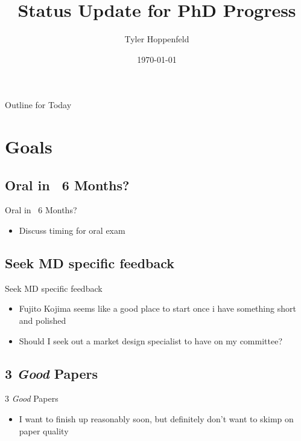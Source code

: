 \documentclass{beamer}
\title[Phd Status]{Status Update for PhD Progress}
\author{Tyler Hoppenfeld}
\institute{UC Davis}
\date{\today}
\begin{document}
\begin{frame}
  \titlepage
\end{frame}

\begin{frame}{Outline for Today}
  \tableofcontents
\end{frame}

\section{Goals}

\subsection{Oral in ~6 Months?}

\begin{frame}{Oral in ~6 Months?}
	\begin{itemize}
		\item Discuss timing for oral exam
	\end{itemize}
\end{frame}

\subsection{Seek MD specific feedback}

\begin{frame}{Seek MD specific feedback}
	\begin{itemize}
		\item Fujito Kojima seems like a good place to start once i have something short and polished
		\item Should I seek out a market design specialist to have on my committee?
	\end{itemize}
\end{frame}





\subsection{3 \emph{Good} Papers}

\begin{frame}{3 \emph{Good} Papers}
	\begin{itemize}
		\item I want to finish up reasonably soon, but definitely don't want to skimp on paper quality
	\end{itemize}
\end{frame}
\end{document}
